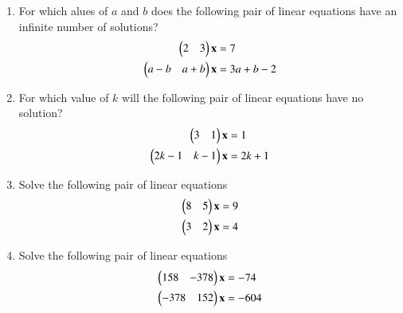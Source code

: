 \begin{enumerate}[label=\arabic*.,ref=\thesubsection.\theenumi]
\begin{enumerate}[itemsep=2pt]
\end{enumerate}
%
\item For which alues of $a$ and $b$ does the following pair of linear equations have an infinite number of solutions?
\begin{align}
\begin{split}
\begin{pmatrix}2 & 3 \end{pmatrix}\mathbf{x}&=7
\\
\begin{pmatrix}a-b & a+b \end{pmatrix}\mathbf{x}&=3a+b-2
\end{split}
\end{align}
\item For which value of $k$ will the following pair of linear equations have no solution?
\begin{align}
\begin{split}
\begin{pmatrix}3 & 1 \end{pmatrix}\mathbf{x}&=1
\\
\begin{pmatrix}2k-1 & k-1 \end{pmatrix}\mathbf{x}&=2k+1
\end{split}
\end{align}
\item Solve the following pair of linear equations
\begin{align}
\begin{split}
\begin{pmatrix}8 & 5 \end{pmatrix}\mathbf{x}&=9
\\
\begin{pmatrix}3 & 2 \end{pmatrix}\mathbf{x}&=4
\end{split}
\end{align}
%
\item Solve the following pair of linear equations
\begin{align}
\begin{split}
\begin{pmatrix}158 & -378 \end{pmatrix}\mathbf{x}&=-74
\\
\begin{pmatrix}-378 & 152 \end{pmatrix}\mathbf{x}&=-604
\end{split}
\end{align}


\end{enumerate}
